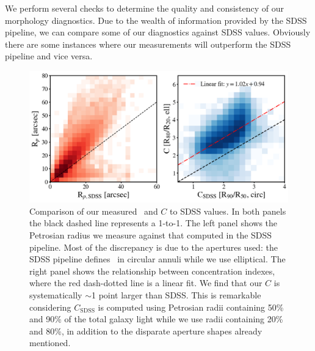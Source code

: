 We perform several checks to determine the quality and consistency of our morphology diagnostics. Due to the wealth of information provided by the SDSS pipeline, we can compare some of our diagnostics against SDSS values. Obviously there are some instances where our measurements will outperform the SDSS pipeline and vice versa. 

\begin{figure}
\centering
\includegraphics[width=\textwidth]{Figures/compare_Rp_concentrations.png}
\caption[Comparison of Petrosian radius and concentration index from this work to SDSS values]{Comparison of our measured \rp~and $C$ to SDSS values. In both panels the black dashed line represents a 1-to-1. The left panel shows the Petrosian radius we measure against that computed in the SDSS pipeline. Most of the discrepancy is due to the apertures used: the SDSS pipeline defines \rp~in circular annuli while we use elliptical. 
The right panel shows the relationship between concentration indexes, where the red dash-dotted line is a linear fit. We find that our $C$ is systematically $\sim$1 point larger than SDSS. This is remarkable considering $C_{\mathrm{SDSS}}$ is computed using Petrosian radii containing 50\% and 90\% of the total galaxy light while we use radii containing 20\% and 80\%, in addition to the disparate aperture shapes already mentioned.}
\label{fig: Rp and C comparison}
\end{figure}

